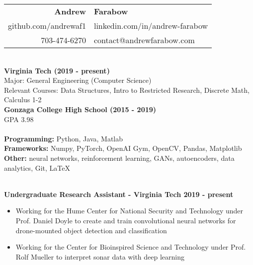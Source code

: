 \documentclass{article}
\begin{document}
  \begin{center}
    \begin{tabular}{r l}
      {\huge\textbf{Andrew}} & {\huge\textbf{Farabow}} \\
      \hspace{35pt} github.com/andrewaf1 & linkedin.com/in/andrew-farabow \\
      703-474-6270 & contact@andrewfarabow.com \\
    \end{tabular}


  \begin{flushleft}
    \begin{multicols}{2}
      {\large\textbf{\underline{}}} \\
       \textbf{Virginia Tech	(2019 - present)} \\
      Major: General Engineering (Computer Science) \\
      Relevant Courses: Data Structures, Intro to Restricted Research, Discrete Math, Calculus 1-2 \\
      \textbf{Gonzaga College High School	(2015 - 2019)} \\
      GPA 3.98 \\
     

    \columnbreak
    {\large\textbf{\underline{}}} \\
    {\textbf{Programming:}} Python, Java, Matlab \\
    {\textbf{Frameworks:}} Numpy, PyTorch, OpenAI Gym, OpenCV, Pandas, Matplotlib \\
    {\textbf{Other:}} neural networks, reinforcement learning, GANs, autoencoders, data analytics, Git, LaTeX \\

    \end{multicols}

    {\large\textbf{\underline{}}} \\
    \textbf{Undergraduate Research Assistant - Virginia Tech \hfill 2019 - present}
    \begin{itemize}
      \item Working for the Hume Center for National Security and Technology under Prof. Daniel Doyle to create and train convolutional neural networks for drone-mounted object detection and classification
      \item Working for the Center for Bioinspired Science and Technology under Prof. Rolf Mueller to interpret sonar data with deep learning
    \end{itemize}



\end{flushleft}
\end{center}
\end{document}
